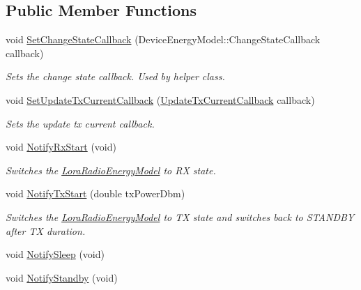\subsection*{Public Member Functions}
\begin{DoxyCompactItemize}
\item 
void \hyperlink{classns3_1_1lorawan_1_1LoraRadioEnergyModelPhyListener_a6a2e034f5e7b492b952a1ae213d572e3}{Set\+Change\+State\+Callback} (Device\+Energy\+Model\+::\+Change\+State\+Callback callback)
\begin{DoxyCompactList}\small\item\em Sets the change state callback. Used by helper class. \end{DoxyCompactList}\item 
void \hyperlink{classns3_1_1lorawan_1_1LoraRadioEnergyModelPhyListener_a6f15e4406f51936ba7c8b8cb03284334}{Set\+Update\+Tx\+Current\+Callback} (\hyperlink{classns3_1_1lorawan_1_1LoraRadioEnergyModelPhyListener_a6e0dbc535ae92d41bf4699ca6d97d229}{Update\+Tx\+Current\+Callback} callback)
\begin{DoxyCompactList}\small\item\em Sets the update tx current callback. \end{DoxyCompactList}\item 
void \hyperlink{classns3_1_1lorawan_1_1LoraRadioEnergyModelPhyListener_a34bb7b2aae72cd8634672bd460247edb}{Notify\+Rx\+Start} (void)
\begin{DoxyCompactList}\small\item\em Switches the \hyperlink{classns3_1_1lorawan_1_1LoraRadioEnergyModel}{Lora\+Radio\+Energy\+Model} to RX state. \end{DoxyCompactList}\item 
void \hyperlink{classns3_1_1lorawan_1_1LoraRadioEnergyModelPhyListener_a42d031fca675ad2a5b76977a7d79e900}{Notify\+Tx\+Start} (double tx\+Power\+Dbm)
\begin{DoxyCompactList}\small\item\em Switches the \hyperlink{classns3_1_1lorawan_1_1LoraRadioEnergyModel}{Lora\+Radio\+Energy\+Model} to TX state and switches back to S\+T\+A\+N\+D\+BY after TX duration. \end{DoxyCompactList}\item 
void \hyperlink{classns3_1_1lorawan_1_1LoraRadioEnergyModelPhyListener_ac4e0739b8ae8f0ed5a94eb8c5e830641}{Notify\+Sleep} (void)
\item 
void \hyperlink{classns3_1_1lorawan_1_1LoraRadioEnergyModelPhyListener_ad5ce1283ba5c34384307338c24446876}{Notify\+Standby} (void)
\end{DoxyCompactItemize}


